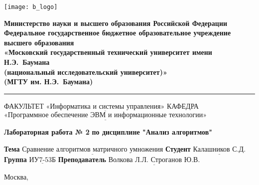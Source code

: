 \thispagestyle{empty}

\noindent \begin{minipage}{0.15\textwidth}
	\texttt{[image: b\_logo]}
\end{minipage}
\noindent\begin{minipage}{0.8\textwidth}\centering
	\textbf{Министерство науки и высшего образования Российской Федерации}\\
	\textbf{Федеральное государственное бюджетное образовательное учреждение высшего образования}\\
	\textbf{«Московский государственный технический университет имени Н.Э.~Баумана}\\
	\textbf{(национальный исследовательский университет)»}\\
	\textbf{(МГТУ им. Н.Э.~Баумана)}
\end{minipage}

\noindent\rule{18cm}{3pt}
\newline\newline
\noindent ФАКУЛЬТЕТ $\underline{\text{«Информатика и системы управления»}}$ \newline\newline
\noindent КАФЕДРА $\underline{\text{«Программное обеспечение ЭВМ и информационные технологии»}}$\newline\newline\newline


\begin{center}
	\noindent\begin{minipage}{1.3\textwidth}\centering
		\Large\textbf{  Лабораторная работа № 2}\newline
		\textbf{по дисциплине "Анализ алгоритмов"}\newline\newline
	\end{minipage}
\end{center}

\noindent\textbf{Тема} $\underline{\text{Сравнение алгоритмов матричного умножения}}$\newline\newline
\noindent\textbf{Студент} $\underline{\text{Калашников С.Д.}}$\newline\newline
\noindent\textbf{Группа} $\underline{\text{ИУ7-53Б}}$\newline\newline
\noindent\textbf{Преподаватель} $\underline{\text{Волкова Л.Л. Строганов Ю.В.}}$\newline

\begin{center}
	\vfill
	Москва,~\the\year
\end{center}
\clearpage
